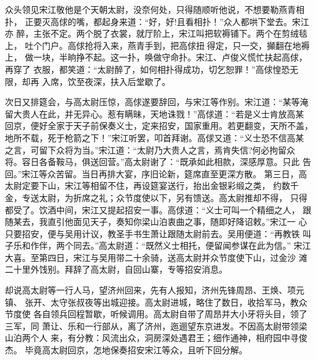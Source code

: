 众头领见宋江敬他是个天朝太尉，没奈何处，只得随顺听他说，不想要勒燕青相扑，
正要灭高俅的嘴，都起身来道：“好，好!且看相扑！”众人都哄下堂去。宋江亦
醉，主张不定。两个脱了衣裳，就厅阶上，宋江叫把软褥铺下。两个在剪绒毯上，
吐个门户。高俅抢将入来，燕青手到，把高俅扭得定，只一交，攧翻在地褥上，
做一块，半晌挣不起。这一扑，唤做守命扑。宋江、卢俊义慌忙扶起高俅，再穿了
衣服，都笑道：“太尉醉了，如何相扑得成功，切乞恕罪！”高俅惶恐无限，却再
入席，饮至夜深，扶入后堂歇了。

次日又排筵会，与高太尉压惊，高俅遂要辞回，与宋江等作别。宋江道：“某等淹
留大贵人在此，并无异心。惹有瞒昧，天地诛戮！”高俅道：“若是义士肯放高某
回京，便好全家于天子前保奏义士，定来招安，国家重用。若更翻变，天所不盖，
地所不载，死于枪箭之下！”宋江听罢，叩首拜谢。高俅又道：“义士恐不信高某
之言，可留下众将为当。”宋江道：“太尉乃大贵人之言，焉肯失信?何必拘留众
将。容日各备鞍马，俱送回营。”高太尉谢了：“既承如此相款，深感厚意。只此
告回。”宋江等众苦留。当日再排大宴，序旧论新，筵席直至更深方散。
第三日，高太尉定要下山，宋江等相留不住，再设筵宴送行，抬出金银彩缎之类，
约数千金，专送太尉，为折席之礼；众节度使以下，另有馈送。高太尉推却不得，
只得都受了。饮酒中间，宋江又提起招安一事。高俅道：“义士可叫一个精细之人，
跟随某去，我直引他面见天子，奏知你梁山泊衷曲之事，随即好降诏敕。”宋江一
心只要招安，便与吴用计议，教圣手书生萧让跟随太尉前去。吴用便道：“再教铁
叫子乐和作伴，两个同去。”高太尉道：“既然义士相托，便留闻参谋在此为信。”
宋江大喜。至第四日，宋江与吴用带二十余骑，送高太尉并众节度使下山，过金沙
滩二十里外饯别。拜辞了高太尉，自回山寨，专等招安消息。

却说高太尉等一行人马，望济州回来，先有人报知，济州先锋周昂、王焕、项元镇、
张开、太守张叔夜等出城迎接。高太尉进城，略住了数日，收拾军马，教众节度使
各自领兵回程暂歇，听候调用。高太尉自带了周昂并大小牙将头目，领了三军，同
萧让、乐和一行部从，离了济州，迤逦望东京进发。不因高太尉带领梁山泊两个人
来，有分教：风流出众，洞房深处遇君王；细作通神，相府园中寻俊杰。
毕竟高太尉回京，怎地保奏招安宋江等众，且听下回分解。